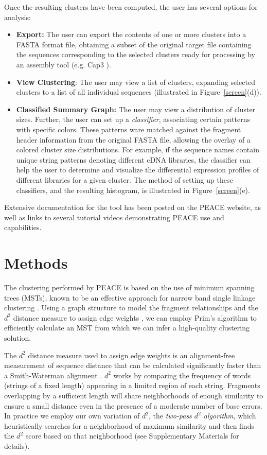 \documentclass[a4,center,fleqn]{NAR}
\newcommand{\peace} {{\small PEACE}}
\newcommand{\capthree} {{\small Cap3}}
\begin{document}
 Once the resulting clusters have been
computed, the user has several options for analysis:
\begin{itemize}
\item {\bf Export:} The user can export the contents of one or more
  clusters into a FASTA format file, obtaining a subset of the
  original target file containing the sequences corresponding to the
  selected clusters ready for processing by an assembly tool
  (e.g. \capthree\/ \cite{Huang99}).
\item {\bf View Clustering}: The user may view a list of clusters,
  expanding selected clusters to a list of all individual sequences
  (illustrated in Figure~\ref{screen}(d)).
\item {\bf Classified Summary Graph:} The user may view a distribution
  of cluster sizes.  Further, the user can set up a {\it classifier},
  associating certain patterns with specific colors.  These patterns
  ware matched against the fragment header information from the
  original FASTA file, allowing the overlay of a colored cluster size
  distributions.  For example, if the sequence names contain unique
  string patterns denoting different cDNA libraries, the classifier
  can help the user to determine and visualize the differential
  expression profiles of different libraries for a given cluster.  The
  method of setting up these classifiers, and the resulting histogram,
  is illustrated in Figure~\ref{screen}(e).
\end{itemize}
Extensive documentation for the tool has been posted on the \peace\/
website, as well as links to several tutorial videos demonstrating
\peace\/ use and capabilities.


\section{Methods}

The clustering performed by \peace\/ is based on the use of minimum
spanning trees (MSTs), known to be an effective approach for narrow
band single linkage clustering \cite{Jain99,Wan08}.  Using a graph
structure to model the fragment relationships and the $d^2$ distance
measure to assign edge weights \cite{Hide94}, we can employ Prim's
algorithm \cite{Prim57} to efficiently calculate an MST from which we
can infer a high-quality clustering solution.

The $d^2$ distance measure used to assign edge weights is an
alignment-free measurement of sequence distance that can be calculated
significantly faster than a Smith-Waterman alignment \cite{Hide94}.
$d^2$ works by comparing the frequency of words (strings of a fixed
length) appearing in a limited region of each string.  Fragments
overlapping by a sufficient length will share neighborhoods of enough
similarity to ensure a small distance even in the presence of a
moderate number of base errors.  In practice we employ our own
variation of $d^2$, the {\it two-pass $d^2$ algorithm}, which
heuristically searches for a neighborhood of maximum similarity and
then finds the $d^2$ score based on that neighborhood (see
Supplementary Materials for details).
\end{document}
